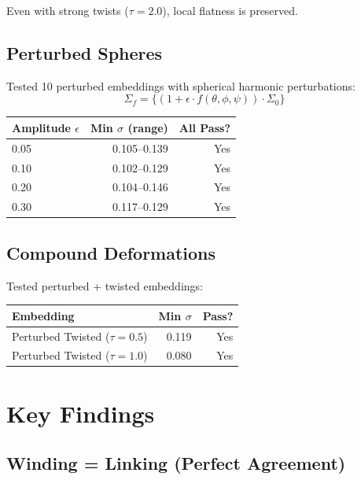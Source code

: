 \documentclass[12pt]{article}
\begin{document}
Even with strong twists ($\tau = 2.0$), local flatness is preserved.

\subsection{Perturbed Spheres}

Tested 10 perturbed embeddings with spherical harmonic perturbations:
\begin{equation}
\Sigma_f = \{(1 + \epsilon \cdot f(\theta, \phi, \psi)) \cdot \Sigma_0\}
\end{equation}

\begin{center}
\begin{tabular}{lrr}
\toprule
\textbf{Amplitude $\epsilon$} & \textbf{Min $\sigma$ (range)} & \textbf{All Pass?} \\
\midrule
0.05 & 0.105--0.139 & Yes \\
0.10 & 0.102--0.129 & Yes \\
0.20 & 0.104--0.146 & Yes \\
0.30 & 0.117--0.129 & Yes \\
\bottomrule
\end{tabular}
\end{center}

\subsection{Compound Deformations}

Tested perturbed + twisted embeddings:

\begin{center}
\begin{tabular}{lrr}
\toprule
\textbf{Embedding} & \textbf{Min $\sigma$} & \textbf{Pass?} \\
\midrule
Perturbed Twisted ($\tau=0.5$) & 0.119 & Yes \\
Perturbed Twisted ($\tau=1.0$) & 0.080 & Yes \\
\bottomrule
\end{tabular}
\end{center}

\section{Key Findings}

\subsection{Winding = Linking (Perfect Agreement)}
\end{document}
